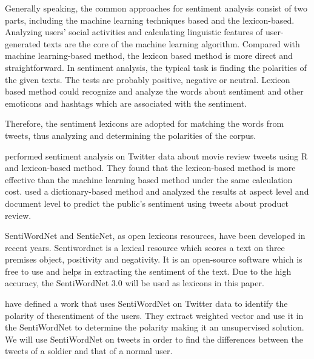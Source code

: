 Generally speaking, the common approaches for sentiment analysis consist of two parts, including the machine learning techniques based and the lexicon-based. Analyzing users’ social activities and calculating linguistic features of user-generated texts are the core of the machine learning algorithm. Compared with machine learning-based method, the lexicon based method is more direct and straightforward. In sentiment analysis, the typical task is finding the polarities of the given texts. The tests are probably positive, negative or neutral. Lexicon based method could recognize and analyze the words about sentiment and other emoticons and hashtags which are associated with the sentiment.

Therefore, the sentiment lexicons are adopted for matching the words from tweets, thus analyzing and determining the polarities of the corpus.

\cite{azizan2019lexicon} performed sentiment analysis on Twitter data about movie review tweets using R and lexicon-based method. They found that the lexicon-based method is more effective than the machine learning based method under the same calculation cost. \cite{8073512} used a dictionary-based method and analyzed the results at aspect level and document level to predict the public’s sentiment using tweets about product review.

SentiWordNet and SenticNet, as open lexicons resources, have been developed in recent years. Sentiwordnet is a lexical resource which scores a text on three premises object, positivity and negativity. It is an open-source software which is free to use and helps in extracting the sentiment of the text. Due to the high accuracy, the SentiWordNet 3.0 \citep{baccianella2010sentiwordnet} will be used as lexicons in this paper.

\cite{montejo2012random} have defined a work that uses SentiWordNet on Twitter data to identify the polarity of thesentiment of the users. They extract weighted vector and use it in the SentiWordNet to determine the polarity making it an unsupervised solution. We will use SentiWordNet on tweets in order to find the differences between the tweets of a soldier and that of a normal user.
